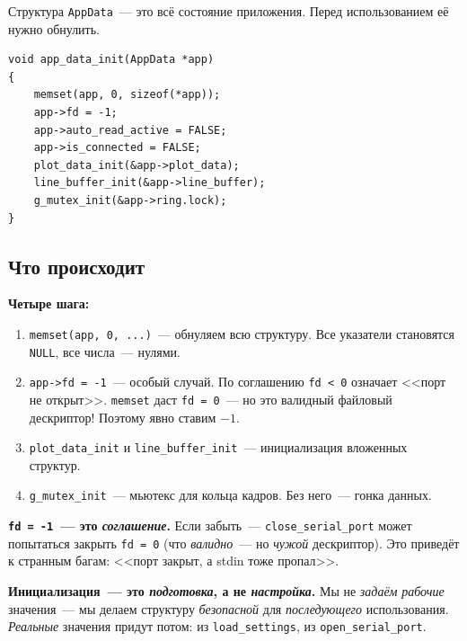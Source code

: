 Структура \texttt{AppData}~--- это всё состояние приложения.
Перед использованием её нужно обнулить.

\begin{listing}[htbp]
\begin{verbatim}
void app_data_init(AppData *app)
{
    memset(app, 0, sizeof(*app));
    app->fd = -1;
    app->auto_read_active = FALSE;
    app->is_connected = FALSE;
    plot_data_init(&app->plot_data);
    line_buffer_init(&app->line_buffer);
    g_mutex_init(&app->ring.lock);
}
\end{verbatim}
\caption{\texttt{app\_data\_init()}}
\label{lst:lifecycle-init}
\end{listing}

\subsection{Что происходит}

\textbf{Четыре шага:}

\begin{enumerate}
    \item \texttt{memset(app, 0, ...)}~--- обнуляем
          всю структуру. Все указатели становятся
          \texttt{NULL}, все числа~--- нулями.
    \item \texttt{app->fd = -1}~--- особый случай.
          По соглашению \texttt{fd < 0} означает
          <<порт не открыт>>. \texttt{memset} даст
          \texttt{fd = 0}~--- но это валидный файловый
          дескриптор! Поэтому явно ставим $-1$.
    \item \texttt{plot\_data\_init} и \texttt{line\_buffer\_init}~---
          инициализация вложенных структур.
    \item \texttt{g\_mutex\_init}~--- мьютекс для кольца
          кадров. Без него~--- гонка данных.
\end{enumerate}

\begin{warnbox}
\textbf{\texttt{fd = -1}~--- это \emph{соглашение}.} Если
забыть~--- \texttt{close\_serial\_port} может попытаться
закрыть \texttt{fd = 0} (что \emph{валидно}~--- но \emph{чужой}
дескриптор). Это приведёт к странным багам: <<порт закрыт,
а stdin тоже пропал>>.
\end{warnbox}

\begin{ideabox}
\textbf{Инициализация~--- это \emph{подготовка}, а не
\emph{настройка}.} Мы не \emph{задаём} \emph{рабочие}
значения~--- мы делаем структуру \emph{безопасной} для
\emph{последующего} использования. \emph{Реальные} значения
придут потом: из \texttt{load\_settings}, из
\texttt{open\_serial\_port}.
\end{ideabox}

